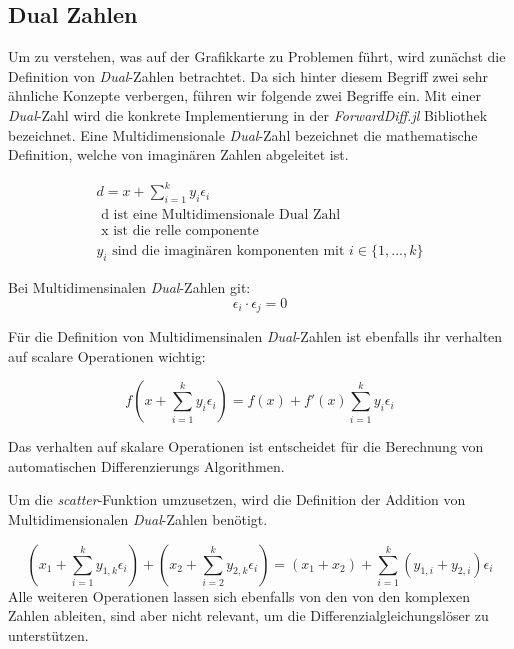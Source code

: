\subsection{Dual Zahlen}

Um zu verstehen, was auf der Grafikkarte zu Problemen führt, 
wird zunächst die Definition von \textit{Dual}-Zahlen betrachtet.
Da sich hinter diesem Begriff zwei sehr ähnliche Konzepte verbergen, 
führen wir folgende zwei Begriffe ein.
Mit einer \textit{Dual}-Zahl wird die konkrete Implementierung in der \textit{ForwardDiff.jl} Bibliothek bezeichnet.
Eine Multidimensionale \textit{Dual}-Zahl bezeichnet die mathematische Definition, 
welche von imaginären Zahlen abgeleitet ist.

\begin{gather}
 d = x + \sum_{i = 1}^{k} y_i \epsilon_i \\
	\text{ d ist eine Multidimensionale Dual Zahl } \\
	\text{ x ist die relle componente } \\
	y_i \text{ sind die imaginären komponenten mit } i \in \{1, ..., k\}
\end{gather}

Bei Multidimensinalen \textit{Dual}-Zahlen git:
\begin{equation}
 \epsilon_i \cdot \epsilon_j = 0
\end{equation}

Für die Definition von Multidimensinalen \textit{Dual}-Zahlen \cite{juliaForwardDiffPackage}
ist ebenfalls ihr verhalten auf scalare Operationen wichtig:

\begin{equation}
 f( x + \sum_{i = 1}^{k} y_i \epsilon_i  ) = f(x) +  f'(x) \sum_{i = 1}^{k} y_i \epsilon_i
\end{equation}

Das verhalten auf skalare Operationen ist entscheidet 
für die Berechnung von automatischen Differenzierungs Algorithmen.

Um die \textit{scatter}-Funktion umzusetzen, 
wird die Definition der Addition von Multidimensionalen \textit{Dual}-Zahlen \cite{RecentAdvances} benötigt.

\begin{equation}
(x_1 + \sum_{i = 1}^{k} y_{1,k} \epsilon_i) + ( x_2 + \sum_{i = 2}^{k} y_{2,k} \epsilon_i) = (x_1 + x_2) + \sum_{i = 1}^{k} (y_{1, i} + y_{2, i}) \epsilon_i
\end{equation}
Alle weiteren Operationen lassen sich ebenfalls von den von den komplexen Zahlen ableiten, 
sind aber nicht relevant, um die Differenzialgleichungslöser zu unterstützen.
